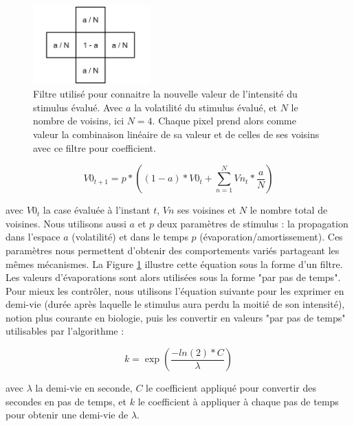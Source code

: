 			\begin{figure}
			\centering
			\includegraphics[width=0.4\textwidth]{./Pictures/Figures/flou.JPG}
			\caption[Filtre utilisé pour connaitre la nouvelle valeur de l'intensité du stimulus évalué.]{Filtre utilisé pour connaitre la nouvelle valeur de l'intensité du stimulus évalué. Avec $a$ la volatilité du stimulus évalué, et $N$ le nombre de voisins, ici $N=4$. Chaque pixel prend alors comme valeur la combinaison linéaire de sa valeur et de celles de ses voisins avec ce filtre pour coefficient.}
			\label{flou}
			\end{figure}
			
			\begin{equation}
			V0_{t+1} = p * ((1-a) * V0_t + \sum_{n=1}^{N} Vn_t * \frac{a}{N})
			\end{equation}
			
			avec $V0_t$ la case évaluée à l'instant $t$, $Vn$ ses voisines et $N$ le nombre total de voisines. Nous utilisons aussi $a$ et $p$ deux paramètres de stimulus : la propagation dans l'espace $a$ (volatilité) et dans le temps $p$ (évaporation/amortissement). Ces paramètres nous permettent d'obtenir des comportements variés partageant les mêmes mécanismes. La Figure \ref{flou} illustre cette équation sous la forme d'un filtre. Les valeurs d'évaporations sont alors utilisées sous la forme "par pas de temps". Pour mieux les contrôler, nous utilisons l'équation suivante pour les exprimer en demi-vie (durée après laquelle le stimulus aura perdu la moitié de son intensité), notion plus courante en biologie, puis les convertir en valeurs "par pas de temps" utilisables par l'algorithme :
			
			\begin{equation}
			k = \exp(\frac{-ln(2) * C}{\lambda})
			\end{equation}
			
			avec $\lambda$ la demi-vie en seconde, $C$ le coefficient appliqué pour convertir des secondes en pas de temps, et $k$ le coefficient à appliquer à chaque pas de temps pour obtenir une demi-vie de $\lambda$.
			

